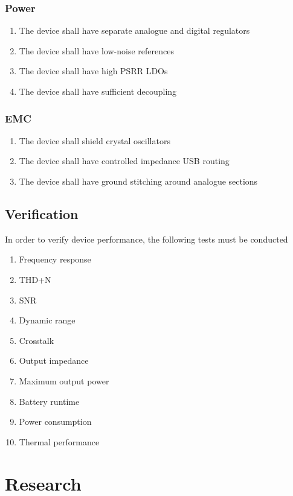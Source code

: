\documentclass{article}
\begin{document}
\subsubsection{Power}
\begin{enumerate}
    \item The device shall have separate analogue and digital regulators
    \item The device shall have low-noise references
    \item The device shall have high PSRR LDOs
    \item The device shall have sufficient decoupling
\end{enumerate}

\subsubsection{EMC}
\begin{enumerate}
    \item The device shall shield crystal oscillators
    \item The device shall have controlled impedance USB routing
    \item The device shall have ground stitching around analogue sections
\end{enumerate}

\subsection{Verification}
In order to verify device performance, the following tests must be conducted
\begin{enumerate}
    \item Frequency response
    \item THD+N
    \item SNR
    \item Dynamic range
    \item Crosstalk
    \item Output impedance
    \item Maximum output power
    \item Battery runtime
    \item Power consumption
    \item Thermal performance
\end{enumerate}



\section{Research}
\end{document}
